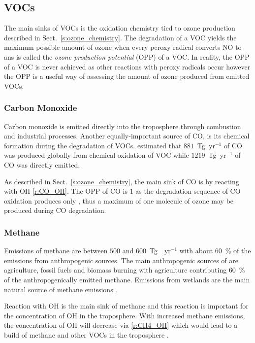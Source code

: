 \subsection{VOCs}
The main sinks of VOCs is the oxidation chemistry tied to ozone production described in Sect.~\ref{s:ozone_chemistry}.
The degradation of a VOC yields the maximum possible amount of ozone when every peroxy radical converts NO to  ans is called the \emph{ozone production potential} (OPP) of a VOC.
In reality, the OPP of a VOC is never achieved as other reactions with peroxy radicals occur however the OPP is a useful way of assessing the amount of ozone produced from emitted VOCs.

\subsubsection{Carbon Monoxide}
Carbon monoxide is emitted directly into the troposphere through combustion and industrial processes.
Another equally-important source of CO, is its chemical formation during the degradation of VOCs.
\citet{Hauglustaine:1998} estimated that $881$~Tg~yr$^{-1}$ of CO was produced globally from chemical oxidation of VOC while $1219$~Tg~yr$^{-1}$ of CO was directly emitted.

As described in Sect.~\ref{s:ozone_chemistry}, the main sink of CO is by reacting with OH \eqref{r:CO_OH}.
The OPP of CO is $1$ as the degradation sequence of CO oxidation produces only , thus a maximum of one molecule of ozone may be produced during CO degradation.

\subsubsection{Methane}
Emissions of methane are between $500$ and $600$~Tg~~yr$^{-1}$ with about $60$~\% of the emissions from anthropogenic sources.
The main anthropogenic sources of  are agriculture, fossil fuels and biomass burning with agriculture contributing $60$~\% of the anthropogenically emitted methane.
Emissions from wetlands are the main natural source of methane emissions \citep{Kirschke:2013}.

Reaction with OH is the main sink of methane and this reaction is important for the concentration of OH in the troposphere.
With increased methane emissions, the concentration of OH will decrease via \eqref{r:CH4_OH} which would lead to a build of methane and other VOCs in the troposphere \citep{Holmes:2013}.

